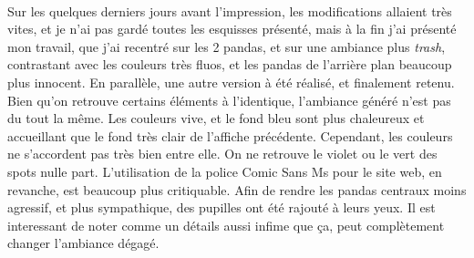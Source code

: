             \begin{center}
                \\
                Sur les quelques derniers jours avant l'impression, les modifications allaient très vites, et je n'ai pas gardé toutes les esquisses présenté, mais à la fin j'ai présenté mon travail, que j'ai recentré sur les 2 pandas, et sur une ambiance plus \emph{trash}, contrastant avec les couleurs très fluos, et les pandas de l'arrière plan beaucoup plus innocent.
                En parallèle, une autre version à été réalisé, et finalement retenu.
                Bien qu'on retrouve certains éléments à l'identique, l'ambiance généré n'est pas du tout la même.
                Les couleurs vive, et le fond bleu sont plus chaleureux et accueillant que le fond très clair de l'affiche précédente.
                Cependant, les couleurs ne s'accordent pas très bien entre elle. On ne retrouve le violet ou le vert des spots nulle part. L'utilisation de la police Comic Sans Ms pour le site web, en revanche, est beaucoup plus critiquable.
                Afin de rendre les pandas centraux moins agressif, et plus sympathique, des pupilles ont été rajouté à leurs yeux.
                Il est interessant de noter comme un détails aussi infime que ça, peut complètement changer l'ambiance dégagé.
            \end{center}
            
